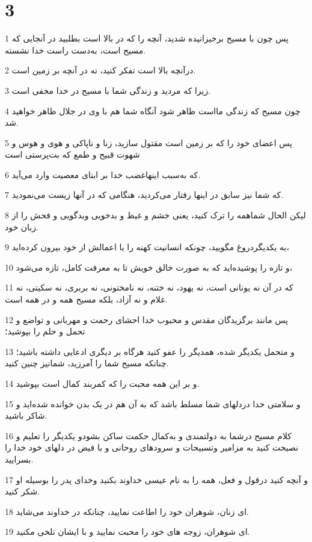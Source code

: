 \chapter{3}

\par 1 پس چون با مسیح برخیزانیده شدید، آنچه را که در بالا است بطلبید در آنجایی که مسیح است، به‌دست راست خدا نشسته.
\par 2 درآنچه بالا است تفکر کنید، نه در آنچه بر زمین است.
\par 3 زیرا که مردید و زندگی شما با مسیح در خدا مخفی است.
\par 4 چون مسیح که زندگی مااست ظاهر شود آنگاه شما هم با وی در جلال ظاهر خواهید شد.
\par 5 پس اعضای خود را که بر زمین است مقتول سازید، زنا و ناپاکی و هوی و هوس و شهوت قبیح و طمع که بت‌پرستی است
\par 6 که به‌سبب اینهاغضب خدا بر ابنای معصیت وارد می‌آید.
\par 7 که شما نیز سابق در اینها رفتار می‌کردید، هنگامی که در آنها زیست می‌نمودید.
\par 8 لیکن الحال شماهمه را ترک کنید، یعنی خشم و غیظ و بدخویی وبدگویی و فحش را از زبان خود.
\par 9 به یکدیگردروغ مگویید، چونکه انسانیت کهنه را با اعمالش از خود بیرون کرده‌اید،
\par 10 و تازه را پوشیده‌اید که به صورت خالق خویش تا به معرفت کامل، تازه می‌شود،
\par 11 که در آن نه یونانی است، نه یهود، نه ختنه، نه نامختونی، نه بربری، نه سکیتی، نه غلام و نه آزاد، بلکه مسیح همه و در همه است.
\par 12 پس مانند برگزیدگان مقدس و محبوب خدا احشای رحمت و مهربانی و تواضع و تحمل و حلم را بپوشید؛
\par 13 و متحمل یکدیگر شده، همدیگر را عفو کنید هرگاه بر دیگری ادعایی داشته باشید؛ چنانکه مسیح شما را آمرزید، شمانیز چنین کنید.
\par 14 و بر این همه محبت را که کمربند کمال است بپوشید.
\par 15 و سلامتی خدا دردلهای شما مسلط باشد که به آن هم در یک بدن خوانده شده‌اید و شاکر باشید.
\par 16 کلام مسیح درشما به دولتمندی و به‌کمال حکمت ساکن بشودو یکدیگر را تعلیم و نصیحت کنید به مزامیر وتسبیحات و سرودهای روحانی و با فیض در دلهای خود خدا را بسرایید.
\par 17 و آنچه کنید درقول و فعل، همه را به نام عیسی خداوند بکنید وخدای پدر را بوسیله او شکر کنید.
\par 18 ‌ای زنان، شوهران خود را اطاعت نمایید، چنانکه در خداوند می‌شاید.
\par 19 ‌ای شوهران، زوجه های خود را محبت نمایید و با ایشان تلخی مکنید.
